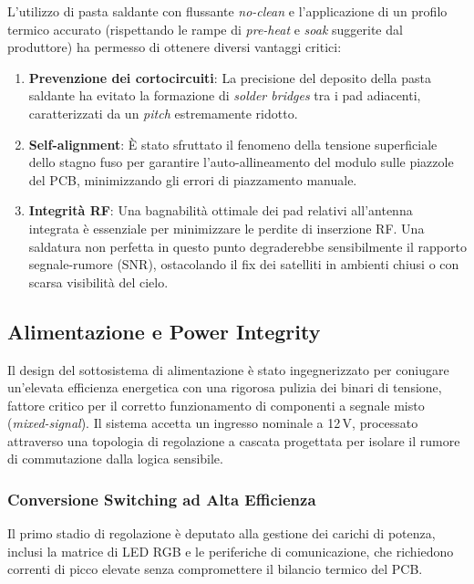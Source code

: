 L'utilizzo di pasta saldante con flussante \textit{no-clean} e l'applicazione di un profilo termico accurato (rispettando le rampe di \textit{pre-heat} e \textit{soak} suggerite dal produttore) ha permesso di ottenere diversi vantaggi critici:
\begin{enumerate}
    \item \textbf{Prevenzione dei cortocircuiti}: La precisione del deposito della pasta saldante ha evitato la formazione di \textit{solder bridges} tra i pad adiacenti, caratterizzati da un \textit{pitch} estremamente ridotto.
    \item \textbf{Self-alignment}: È stato sfruttato il fenomeno della tensione superficiale dello stagno fuso per garantire l'auto-allineamento del modulo sulle piazzole del PCB, minimizzando gli errori di piazzamento manuale.
    \item \textbf{Integrità RF}: Una bagnabilità ottimale dei pad relativi all'antenna integrata è essenziale per minimizzare le perdite di inserzione RF. Una saldatura non perfetta in questo punto degraderebbe sensibilmente il rapporto segnale-rumore (SNR), ostacolando il fix dei satelliti in ambienti chiusi o con scarsa visibilità del cielo.
\end{enumerate}


\subsection{Alimentazione e Power Integrity}

Il design del sottosistema di alimentazione è stato ingegnerizzato per coniugare un'elevata efficienza energetica con una rigorosa pulizia dei binari di tensione, fattore critico per il corretto funzionamento di componenti a segnale misto (\textit{mixed-signal}). Il sistema accetta un ingresso nominale a 12\,V, processato attraverso una topologia di regolazione a cascata progettata per isolare il rumore di commutazione dalla logica sensibile.

\subsubsection*{Conversione Switching ad Alta Efficienza}

Il primo stadio di regolazione è deputato alla gestione dei carichi di potenza, inclusi la matrice di LED RGB e le periferiche di comunicazione, che richiedono correnti di picco elevate senza compromettere il bilancio termico del PCB.

